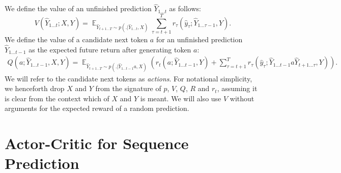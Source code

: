 \documentclass{article} \usepackage{iclr2017_conference,times}
\DeclareMathOperator*{\Exp}{\mathbb{E}}
\begin{document}
We define the value of an unfinished
prediction $\hat{Y}_{1 \ldots t}$ as follows:
\begin{equation*}
    V(\hat{Y}_{1 \ldots t}; X, Y) = 
    \Exp_{
        \hat{Y}_{t+1 \ldots T}
        \sim p(.| \hat{Y}_{1 \ldots t}, X)
    } \sum\limits_{\tau=t+1}^T r_{\tau}(\hat{y}_{\tau}; \hat{Y}_{1 \ldots \tau - 1}, Y).
\end{equation*}    
We define the value of a candidate next token $a$ for an unfinished prediction 
$\hat{Y}_{1 \ldots t - 1}$ as the expected future return after generating token $a$: 
\begin{align*}
    Q(a; \hat{Y}_{1 \ldots t - 1}, X, Y) = 
    \Exp_{
        \hat{Y}_{t+1 \ldots T}
        \sim p(.|\hat{Y}_{1 \ldots t - 1} a,  X)
    } 
    \left(
    r_{t}(a; \hat{Y}_{1 \ldots t-1}, Y) + 
    \sum\limits_{\tau=t+1}^{T} 
    r_{\tau}(\hat{y}_{\tau}; \hat{Y}_{1 \ldots t-1} a \hat{Y}_{t+1 \ldots \tau}, Y)
    \right).        
\end{align*}
We will refer to the candidate next tokens as \textit{actions}.
For notational simplicity, we henceforth drop $X$ and $Y$ from the signature
of $p$, $V$, $Q$, $R$ and $r_t$, assuming it is clear from the context which of $X$ and $Y$ is
meant.  We will also use $V$ without arguments for the expected reward of
a random prediction.

\section{Actor-Critic for Sequence Prediction}

\label{sec:actor-critic}
\end{document}

